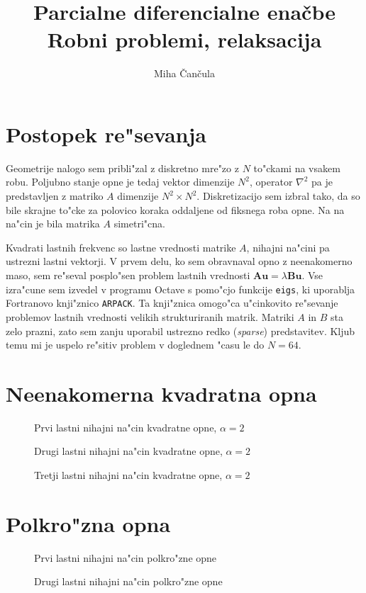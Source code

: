 \documentclass[a4paper,10pt]{article}
\title{Parcialne diferencialne ena\v cbe \\ Robni problemi, relaksacija}
\author{Miha \v Can\v cula}
\renewcommand{\vec}{\mathbf}
\begin{document}
\maketitle

\section{Postopek re"sevanja}

Geometrije nalogo sem pribli"zal z diskretno mre"zo z $N$ to"ckami na vsakem robu. Poljubno stanje opne je tedaj vektor dimenzije $N^2$, operator $\nabla^2$ pa je predstavljen z matriko $A$ dimenzije $N^2 \times N^2$. Diskretizacijo sem izbral tako, da so bile skrajne to"cke za polovico koraka oddaljene od fiksnega roba opne. Na na na"cin je bila matrika $A$ simetri"cna. 

Kvadrati lastnih frekvenc so lastne vrednosti matrike $A$, nihajni na"cini pa ustrezni lastni vektorji. V prvem delu, ko sem obravnaval opno z neenakomerno maso, sem re"seval posplo"sen problem lastnih vrednosti $\vec A\vec u = \lambda \vec B \vec u$. Vse izra"cune sem izvedel v programu Octave s pomo"cjo funkcije \texttt{eigs}, ki uporablja Fortranovo knji"znico \texttt{ARPACK}. Ta knji"znica omogo"ca u"cinkovito re"sevanje problemov lastnih vrednosti velikih strukturiranih matrik. Matriki $A$ in $B$ sta zelo prazni, zato sem zanju uporabil ustrezno redko (\textit{sparse}) predstavitev. Kljub temu mi je uspelo re"sitiv problem v doglednem "casu le do $N = 64$. 

\section{Neenakomerna kvadratna opna}

\begin{figure}[H]

  \caption{Prvi lastni nihajni na"cin kvadratne opne, $\alpha = 2$}
  \label{fig:opna-2-1}
\end{figure}

\begin{figure}[H]

  \caption{Drugi lastni nihajni na"cin kvadratne opne, $\alpha = 2$}
  \label{fig:opna-2-2}
\end{figure}

\begin{figure}[H]

  \caption{Tretji lastni nihajni na"cin kvadratne opne, $\alpha = 2$}
  \label{fig:opna-2-3}
\end{figure}

\section{Polkro"zna opna}

\begin{figure}[H]

  \caption{Prvi lastni nihajni na"cin polkro"zne opne}
  \label{fig:valj-1}
\end{figure}

\begin{figure}[H]

  \caption{Drugi lastni nihajni na"cin polkro"zne opne}
  \label{fig:valj-2}
\end{figure}
\end{document}
